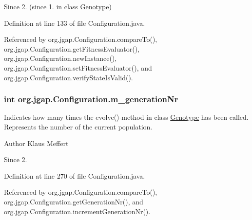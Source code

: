 \begin{DoxySince}{Since}
2. (since 1. in class \hyperlink{classorg_1_1jgap_1_1_genotype}{Genotype}) 
\end{DoxySince}


Definition at line 133 of file Configuration.\-java.



Referenced by org.\-jgap.\-Configuration.\-compare\-To(), org.\-jgap.\-Configuration.\-get\-Fitness\-Evaluator(), org.\-jgap.\-Configuration.\-new\-Instance(), org.\-jgap.\-Configuration.\-set\-Fitness\-Evaluator(), and org.\-jgap.\-Configuration.\-verify\-State\-Is\-Valid().

\hypertarget{classorg_1_1jgap_1_1_configuration_ae42ade47e4025ee1260a8c1190b1e370}{
\subsubsection[{m\-\_\-generation\-Nr}]{\setlength{\rightskip}{0pt plus 5cm}int org.\-jgap.\-Configuration.\-m\-\_\-generation\-Nr\hspace{0.3cm}{\ttfamily [private]}}}\label{classorg_1_1jgap_1_1_configuration_ae42ade47e4025ee1260a8c1190b1e370}
Indicates how many times the evolve()-\/method in class \hyperlink{classorg_1_1jgap_1_1_genotype}{Genotype} has been called. Represents the number of the current population.

\begin{DoxyAuthor}{Author}
Klaus Meffert 
\end{DoxyAuthor}
\begin{DoxySince}{Since}
2. 
\end{DoxySince}


Definition at line 270 of file Configuration.\-java.



Referenced by org.\-jgap.\-Configuration.\-compare\-To(), org.\-jgap.\-Configuration.\-get\-Generation\-Nr(), and org.\-jgap.\-Configuration.\-increment\-Generation\-Nr().

